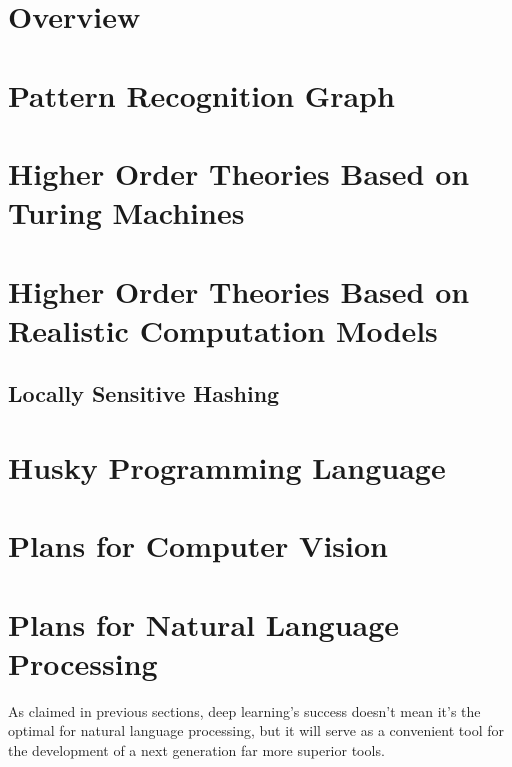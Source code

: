 \documentclass[11pt, oneside]{article}   	%
\theoremstyle{definition}
\begin{document}
{

\section{Overview}



\section{ Pattern Recognition Graph}



\section{Higher Order Theories Based on Turing Machines}




\section{Higher Order Theories Based on Realistic Computation Models}

\subsection{Locally Sensitive Hashing}

\section{Husky Programming Language}



\section{Plans for Computer Vision}

\section{Plans for Natural Language Processing}

As claimed in previous sections, deep learning's success doesn't mean it's the optimal for natural language processing, but it will serve as a convenient tool for the development of a next generation far more superior tools.

}
\end{document}
